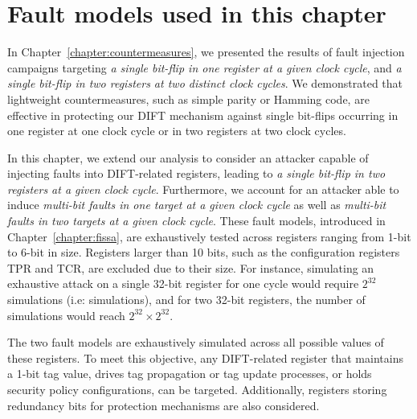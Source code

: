 \section{Fault models used in this chapter}
\label{section:chap6_faultmodels}
In Chapter~\ref{chapter:countermeasures}, we presented the results of fault injection campaigns targeting \textit{a single bit-flip in one register at a given clock cycle}, and \textit{a single bit-flip in two registers at two distinct clock cycles}. We demonstrated that lightweight countermeasures, such as simple parity or Hamming code, are effective in protecting our DIFT mechanism against single bit-flips occurring in one register at one clock cycle or in two registers at two clock cycles.

In this chapter, we extend our analysis to consider an attacker capable of injecting faults into DIFT-related registers, leading to \textit{a single bit-flip in two registers at a given clock cycle}. Furthermore, we account for an attacker able to induce \textit{multi-bit faults in one target at a given clock cycle} as well as \textit{multi-bit faults in two targets at a given clock cycle}. These fault models, introduced in Chapter~\ref{chapter:fissa}, are exhaustively tested across registers ranging from 1-bit to 6-bit in size. Registers larger than 10 bits, such as the configuration registers TPR and TCR, are excluded due to their size. For instance, simulating an exhaustive attack on a single 32-bit register for one cycle would require $2^{32}$ simulations (i.e:  simulations), and for two 32-bit registers, the number of simulations would reach $2^{32} \times 2^{32}$.

The two fault models are exhaustively simulated across all possible values of these registers. To meet this objective, any DIFT-related register that maintains a 1-bit tag value, drives tag propagation or tag update processes, or holds security policy configurations, can be targeted. Additionally, registers storing redundancy bits for protection mechanisms are also considered.

  


